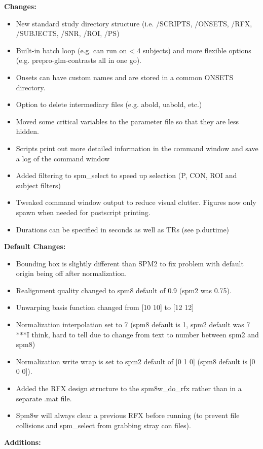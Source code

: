 \documentclass[12pt]{article}
\begin{document}
\noindent
\textbf{Changes:}
\begin{itemize}
	\item New standard study directory structure (i.e. /SCRIPTS, /ONSETS, /RFX, /SUBJECTS, /SNR, /ROI, /PS)
	\item Built-in batch loop (e.g. can run on < 4 subjects) and more flexible options (e.g. prepro-glm-contrasts all in one go).
	\item Onsets can have custom names and are stored in a common ONSETS directory.
	\item Option to delete intermediary files (e.g. abold, uabold, etc.)
	\item Moved some critical variables to the parameter file so that they are less hidden.
	\item Scripts print out  more detailed information in the command window and save a log of the command window 
	\item Added filtering to spm\_select to speed up selection (P, CON, ROI and subject filters) 
	\item Tweaked command window output to reduce visual clutter. Figures now only spawn when needed for postscript printing.
	\item Durations can be specified in seconds as well as TRs (see p.durtime)
\end{itemize}
\noindent
\textbf{Default Changes:}
\begin{itemize}
	\item Bounding box is slightly different than SPM2 to fix problem with default origin being off after normalization.
	\item Realignment quality changed to spm8 default of 0.9 (spm2 was 0.75).
	\item Unwarping basis function changed from [10 10] to [12 12]
	\item Normalization interpolation set to 7 (spm8 default is 1, spm2 default was 7 ***I think, hard to tell due to change from text to number between spm2 and spm8)
	\item Normalization write wrap is set to spm2 default of [0 1 0] (spm8 default is [0 0 0]).
	\item Added the RFX design structure to the spm8w\_do\_rfx rather than in a separate .mat file.
	\item Spm8w will always clear a previous RFX before running (to prevent file collisions and spm\_select from grabbing stray con files).
\end{itemize}
\noindent
\textbf{Additions:}
\end{document}
